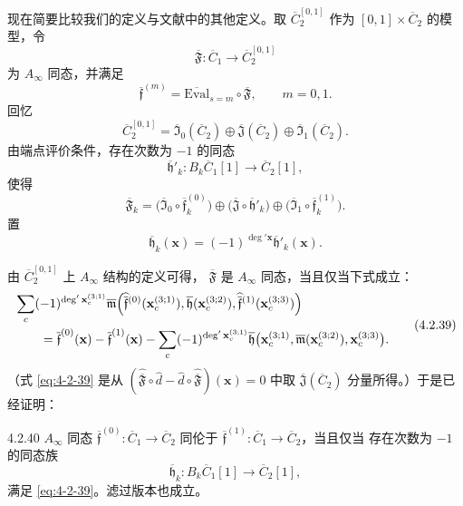 现在简要比较我们的定义与文献中的其他定义。取
$\overline C_2^{[0,1]}$ 作为 $[0,1]\times\overline C_2$ 的模型，令
\[
 \overline{\mathfrak F}\colon\overline C_1
 \longrightarrow\overline C_2^{[0,1]}
\]
为 $A_\infty$ 同态，并满足
\[
 \overline{\mathfrak f}^{(m)}
 =\overline{\mathrm{Eval}}_{s=m}\circ\overline{\mathfrak F},
 \qquad m=0,1.
\]
回忆
\[
 \overline C_2^{[0,1]}
 =\overline{\mathfrak I}_0(\overline C_2)
  \oplus\overline{\mathfrak J}(\overline C_2)
  \oplus\overline{\mathfrak I}_1(\overline C_2).
\]
由端点评价条件，存在次数为 $-1$ 的同态
\[
 \overline{\mathfrak h}'_k\colon
 B_k\overline C_1[1]\longrightarrow\overline C_2[1],
\]
使得
\[
 \overline{\mathfrak F}_k
 =\bigl(\overline{\mathfrak I}_0\circ
        \overline{\mathfrak f}^{(0)}_k\bigr)
  \oplus\bigl(\overline{\mathfrak J}\circ
        \overline{\mathfrak h}'_k\bigr)
  \oplus\bigl(\overline{\mathfrak I}_1\circ
        \overline{\mathfrak f}^{(1)}_k\bigr).
\]
置
\[
 \overline{\mathfrak h}_k(\mathbf x)
 =(-1)^{\deg'\mathbf x}\overline{\mathfrak h}'_k(\mathbf x).
\]

由 $\overline C_2^{[0,1]}$ 上 $A_\infty$ 结构的定义可得，
$\overline{\mathfrak F}$ 是 $A_\infty$ 同态，当且仅当下式成立：
{\small
\begin{equation}
\begin{aligned}
&\sum_c(-1)^{\deg'\mathbf x_c^{(3;1)}}
 \overline{\mathfrak m}\Bigl(
  \widehat{\overline{\mathfrak f}}{}^{(0)}
    (\mathbf x_c^{(3;1)}),
  \overline{\mathfrak h}(\mathbf x_c^{(3;2)}),
  \widehat{\overline{\mathfrak f}}{}^{(1)}
    (\mathbf x_c^{(3;3)})\Bigr)\\
&\qquad=\overline{\mathfrak f}^{(0)}(\mathbf x)
 -\overline{\mathfrak f}^{(1)}(\mathbf x)
 -\sum_c(-1)^{\deg'\mathbf x_c^{(3;1)}}
  \overline{\mathfrak h}\bigl(
   \mathbf x_c^{(3;1)},
   \overline{\mathfrak m}(\mathbf x_c^{(3;2)}),
   \mathbf x_c^{(3;3)}\bigr).
\end{aligned}
\tag{4.2.39}\label{eq:4-2-39}
\end{equation}
}
（式 \eqref{eq:4-2-39} 是从
$(\widehat{\overline{\mathfrak F}}\circ\widehat d
-\widehat d\circ\widehat{\overline{\mathfrak F}})(\mathbf x)=0$
中取 $\overline{\mathfrak J}(\overline C_2)$ 分量所得。）于是已经证明：

\begin{proposition}{4.2.40}\label{prop:4-2-40}
$A_\infty$ 同态
$\overline{\mathfrak f}^{(0)}\colon\overline C_1\to\overline C_2$
同伦于
$\overline{\mathfrak f}^{(1)}\colon\overline C_1\to\overline C_2$，当且仅当
存在次数为 $-1$ 的同态族
\[
 \overline{\mathfrak h}_k\colon
 B_k\overline C_1[1]\longrightarrow\overline C_2[1],
\]
满足 \eqref{eq:4-2-39}。滤过版本也成立。
\end{proposition}

